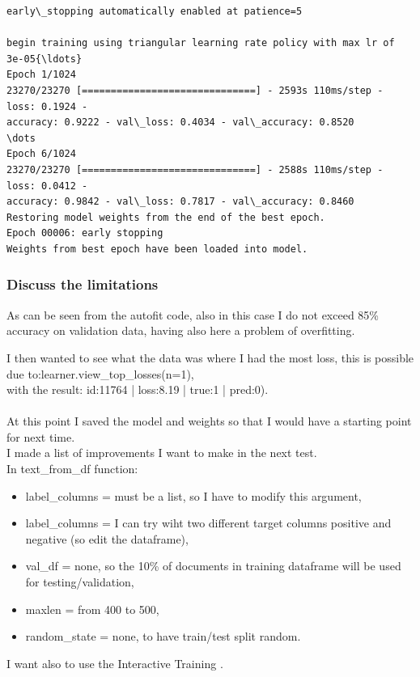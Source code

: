  \begin{Verbatim}[commandchars=\\\{\},fontsize=\footnotesize]
early\_stopping automatically enabled at patience=5

begin training using triangular learning rate policy with max lr of 3e-05{\ldots}
Epoch 1/1024
23270/23270 [==============================] - 2593s 110ms/step - loss: 0.1924 -
accuracy: 0.9222 - val\_loss: 0.4034 - val\_accuracy: 0.8520
\dots
Epoch 6/1024
23270/23270 [==============================] - 2588s 110ms/step - loss: 0.0412 -
accuracy: 0.9842 - val\_loss: 0.7817 - val\_accuracy: 0.8460
Restoring model weights from the end of the best epoch.
Epoch 00006: early stopping
Weights from best epoch have been loaded into model.
    \end{Verbatim}

\subsubsection{Discuss the limitations} 
As can be seen from the autofit code, also in this case I do not exceed 85\% accuracy on validation data, having also here a problem of overfitting.

I then wanted to see what the data was where I had the most loss, this is possible due to:learner.view\_top\_losses(n=1),\\
with the result: id:11764 | loss:8.19 | true:1 | pred:0).\\
\\
At this point I saved the model and weights so that I would have a starting point for next time.\\
I made a list of improvements I want to make in the next test.\\
In text\_from\_df function:
\begin{itemize}
    \item label\_columns = must be a list, so I have to modify this argument,
    \item label\_columns = I can try wiht two different target columns positive and negative (so edit the dataframe),
    \item val\_df = none, so the 10\% of documents in training dataframe will be used for testing/validation,
    \item maxlen = from 400 to 500,
    \item random\_state = none, to have train/test split random.
\end{itemize}

I want also to use the Interactive Training \cite{jupyter_1204}.

